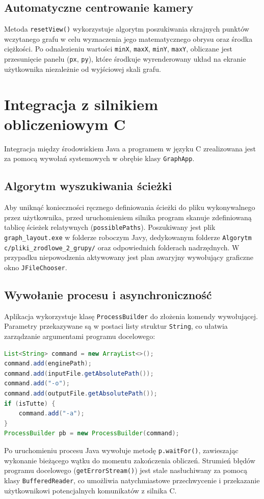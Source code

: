 \documentclass[12pt, a4paper]{article}
\begin{document}
\subsection{Automatyczne centrowanie kamery}
Metoda \texttt{resetView()} wykorzystuje algorytm poszukiwania skrajnych punktów wczytanego grafu w celu wyznaczenia jego matematycznego obrysu oraz środka ciężkości. Po odnalezieniu wartości \texttt{minX}, \texttt{maxX}, \texttt{minY}, \texttt{maxY}, obliczane jest przesunięcie panelu (\texttt{px}, \texttt{py}), które środkuje wyrenderowany układ na ekranie użytkownika niezależnie od wyjściowej skali grafu.

\section{Integracja z silnikiem obliczeniowym C}
Integracja między środowiskiem Java a programem w języku C zrealizowana jest za pomocą wywołań systemowych w obrębie klasy \texttt{GraphApp}.

\subsection{Algorytm wyszukiwania ścieżki}
Aby uniknąć konieczności ręcznego definiowania ścieżki do pliku wykonywalnego przez użytkownika, przed uruchomieniem silnika program skanuje zdefiniowaną tablicę ścieżek relatywnych (\texttt{possiblePaths}). Poszukiwany jest plik \texttt{graph\_layout.exe} w folderze roboczym Javy, dedykowanym folderze \texttt{Algorytm c/pliki\_zrodlowe\_2\_grupy/} oraz odpowiednich folderach nadrzędnych. W przypadku niepowodzenia aktywowany jest plan awaryjny wywołujący graficzne okno \texttt{JFileChooser}.

\subsection{Wywołanie procesu i asynchroniczność}
Aplikacja wykorzystuje klasę \texttt{ProcessBuilder} do złożenia komendy wywołującej. Parametry przekazywane są w postaci listy struktur \texttt{String}, co ułatwia zarządzanie argumentami programu docelowego:
\begin{lstlisting}[language=Java]
List<String> command = new ArrayList<>();
command.add(enginePath);
command.add(inputFile.getAbsolutePath());
command.add("-o");
command.add(outputFile.getAbsolutePath());
if (isTutte) {
    command.add("-a");
}
ProcessBuilder pb = new ProcessBuilder(command);
\end{lstlisting}
Po uruchomieniu procesu Java wywołuje metodę \texttt{p.waitFor()}, zawieszając wykonanie bieżącego wątku do momentu zakończenia obliczeń. Strumień błędów programu docelowego (\texttt{getErrorStream()}) jest stale nasłuchiwany za pomocą klasy \texttt{BufferedReader}, co umożliwia natychmiastowe przechwycenie i przekazanie użytkownikowi potencjalnych komunikatów z silnika C.
\end{document}
